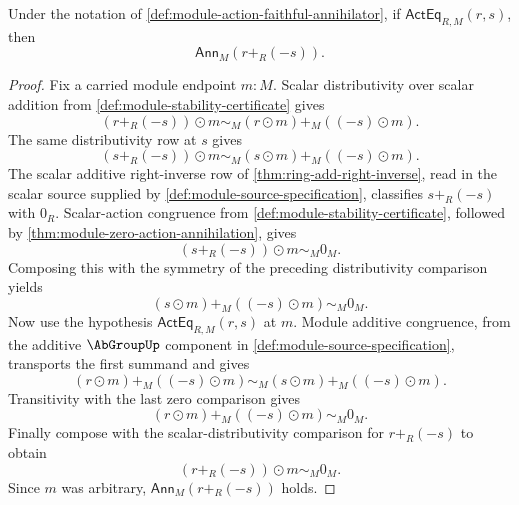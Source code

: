 \begin{lemma}
\label{lem:module-pointwise-action-equality-difference-annihilator}
Under the notation of \autoref{def:module-action-faithful-annihilator}, if
$\mathsf{ActEq}_{R,M}(r,s)$, then
$$
\mathsf{Ann}_M(r+_R(-s)).
$$
\end{lemma}
\begin{proof}
Fix a carried module endpoint $m:M$. Scalar distributivity over scalar addition from \autoref{def:module-stability-certificate} gives
$$
(r+_R(-s))\odot m\sim_M (r\odot m)+_M((-s)\odot m).
$$
The same distributivity row at $s$ gives
$$
(s+_R(-s))\odot m\sim_M (s\odot m)+_M((-s)\odot m).
$$
The scalar additive right-inverse row of \autoref{thm:ring-add-right-inverse}, read in the scalar source supplied by \autoref{def:module-source-specification}, classifies $s+_R(-s)$ with $0_R$. Scalar-action congruence from \autoref{def:module-stability-certificate}, followed by \autoref{thm:module-zero-action-annihilation}, gives
$$
(s+_R(-s))\odot m\sim_M 0_M.
$$
Composing this with the symmetry of the preceding distributivity comparison yields
$$
(s\odot m)+_M((-s)\odot m)\sim_M 0_M.
$$
Now use the hypothesis $\mathsf{ActEq}_{R,M}(r,s)$ at $m$. Module additive congruence, from the additive $\AbGroupUp$ component in \autoref{def:module-source-specification}, transports the first summand and gives
$$
(r\odot m)+_M((-s)\odot m)\sim_M (s\odot m)+_M((-s)\odot m).
$$
Transitivity with the last zero comparison gives
$$
(r\odot m)+_M((-s)\odot m)\sim_M 0_M.
$$
Finally compose with the scalar-distributivity comparison for $r+_R(-s)$ to obtain
$$
(r+_R(-s))\odot m\sim_M 0_M.
$$
Since $m$ was arbitrary, $\mathsf{Ann}_M(r+_R(-s))$ holds.
\end{proof}

